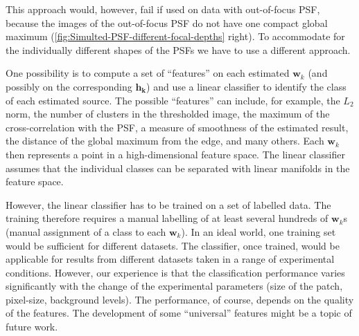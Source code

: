 This approach would, however, fail if used on data with out-of-focus PSF, because the images of the out-of-focus PSF do not have one compact global maximum (\autoref{fig:Simulted-PSF-different-focal-depths} right). To accommodate for the individually different shapes of the PSFs we have to use a different approach. 

One possibility is to compute a set of ``features'' on each estimated $\bm{w}_k$ (and possibly on the corresponding $\bm{h_k}$) and use a linear classifier to identify the class of each estimated source. The possible ``features'' can include, for example, the $L_2$ norm, the number of clusters in the thresholded image, the maximum of the cross-correlation with the PSF, a measure of smoothness of the estimated result, the distance of the global maximum from the edge, and many others. Each $\bm{w}_k$ then represents a point in a high-dimensional feature space. The linear classifier assumes that the individual classes can be separated with linear manifolds in the feature space.

However, the linear classifier has to be trained on a set of labelled data. The training therefore requires a manual labelling of at least several hundreds of $\bm{w}_k$s (manual assignment of a class to each $\bm{w}_k$). In an ideal world, one training set would be sufficient for different datasets. The classifier, once trained, would be applicable for results from different datasets taken in a range of experimental conditions. However, our experience is that the classification performance varies significantly with the change of the experimental parameters (size of the patch, pixel-size, background levels). The performance, of course, depends on the quality of the features.  The development of some ``universal'' features might be a topic of future work. 


